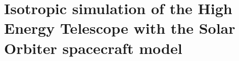 \chapter{Isotropic simulation of the High Energy Telescope with the Solar Orbiter spacecraft model}
\label{chp:HETSimulation}

